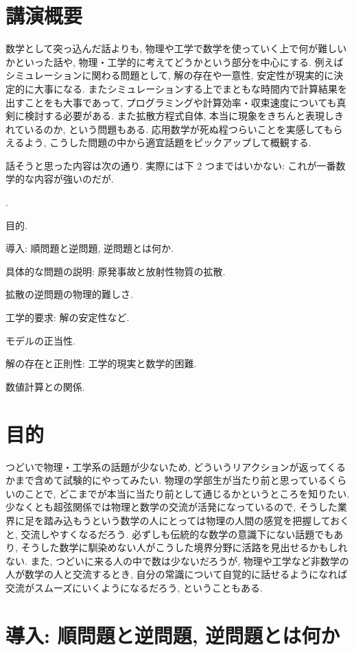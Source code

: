 \documentclass[openany, a4paper, oneside]{jsbook}
\newcounter{enum2}
\renewenvironment{enumerate}{%
\begin{list}%
{%
\arabic{enum2}.\ \,%
}%
{%
\usecounter{enum2}
\setlength{\itemindent}{0pt}%
\setlength{\leftmargin}{15pt}%
\setlength{\rightmargin}{0pt}%
\setlength{\labelsep}{0pt}%
\setlength{\labelwidth}{6pt}%
\setlength{\itemsep}{0pt}%
\setlength{\parsep}{0pt}%
\setlength{\listparindent}{0pt}%
}
}{%
\end{list}%
}
\theoremstyle{break}
\theoremstyle{breakdefn}
\begin{document}
\section{講演概要}


数学として突っ込んだ話よりも, 物理や工学で数学を使っていく上で何が難しいかといった話や,
物理・工学的に考えてどうかという部分を中心にする.
例えばシミュレーションに関わる問題として, 解の存在や一意性, 安定性が現実的に決定的に大事になる.
またシミュレーションする上でまともな時間内で計算結果を出すことをも大事であって,
プログラミングや計算効率・収束速度についても真剣に検討する必要がある.
また拡散方程式自体, 本当に現象をきちんと表現しきれているのか, という問題もある.
応用数学が死ぬ程つらいことを実感してもらえるよう,
こうした問題の中から適宜話題をピックアップして概観する.

話そうと思った内容は次の通り.
実際には下 2 つまではいかない: これが一番数学的な内容が強いのだが.
\begin{enumerate}
\item 目的.
\item 導入: 順問題と逆問題, 逆問題とは何か.
\item 具体的な問題の説明: 原発事故と放射性物質の拡散.
\item 拡散の逆問題の物理的難しさ.
\item 工学的要求: 解の安定性など.
\item モデルの正当性.
\item 解の存在と正則性: 工学的現実と数学的困難.
\item 数値計算との関係.
\end{enumerate}
\section{目的}


つどいで物理・工学系の話題が少ないため, どういうリアクションが返ってくるかまで含めて試験的にやってみたい.
物理の学部生が当たり前と思っているくらいのことで, どこまでが本当に当たり前として通じるかというところを知りたい.
少なくとも超弦関係では物理と数学の交流が活発になっているので,
そうした業界に足を踏み込もうという数学の人にとっては物理の人間の感覚を把握しておくと, 交流しやすくなるだろう.
必ずしも伝統的な数学の意識下にない話題でもあり, そうした数学に馴染めない人がこうした境界分野に活路を見出せるかもしれない.
また, つどいに来る人の中で数は少ないだろうが, 物理や工学など非数学の人が数学の人と交流するとき,
自分の常識について自覚的に話せるようになれば交流がスムーズにいくようになるだろう, ということもある.
\section{導入: 順問題と逆問題, 逆問題とは何か}
\end{document}
